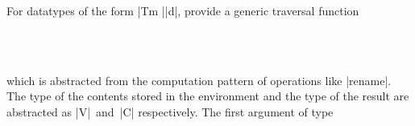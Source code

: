 \documentclass[sigplan,review,fleqn]{acmart}
\renewcommand{\verb}{\collectverb{\color{AgdaFunction}}}
\newcommand{\name}{\collectverb{\it}}
\begin{document}
For datatypes of the form \verb|Tm |\name|d|, \citeauthor{Allais-generic-syntax} provide a generic traversal function
\begin{code}
	\>[0]%
	\>[226I]\AgdaSymbol{:}\AgdaSpace{}%
	\AgdaSpace{}%
	\AgdaSpace{}%
	\AgdaSpace{}%
	\<%
	\\
	\>[.][@{}l@{}]\<[226I]%
	\>[10]\AgdaSpace{}%
	\AgdaSpace{}%
	\AgdaSymbol{\{}\AgdaSymbol{\}}\AgdaSpace{}%
	\AgdaSpace{}%
	\AgdaSpace{}%
	\AgdaSpace{}%
	\AgdaSpace{}%
	\AgdaSpace{}%
	\AgdaSpace{}%
	\AgdaSpace{}%
	\AgdaSymbol{)}\<%
	\\
	\>[10]\AgdaSpace{}%
	\AgdaSpace{}%
	\AgdaSpace{}%
	\AgdaSpace{}%
	\AgdaSpace{}%
	\AgdaSpace{}%
	\AgdaSpace{}%
	\AgdaSpace{}%
	\<%
\end{code}
which is abstracted from the computation pattern of operations like \verb|rename|.
The type of the contents stored in the environment and the type of the result are abstracted as \name|V|~and~\name|C| respectively.
The first argument of type
\begin{code}
	\>[0]\AgdaSpace{}%
	\AgdaSpace{}%
	\AgdaSymbol{(}\AgdaSpace{}%
	\AgdaSymbol{:}\AgdaSpace{}%
	\AgdaSpace{}%
	\AgdaSymbol{)}\AgdaSpace{}%
	\AgdaSymbol{(}\AgdaSpace{}%
	\AgdaSpace{}%
	\AgdaSymbol{:}\AgdaSpace{}%
	\AgdaSpace{}%
	\AgdaSpace{}%
	\AgdaSpace{}%
	\AgdaSpace{}%
	\AgdaSpace{}%
	\AgdaSymbol{)}\AgdaSpace{}%
	\AgdaSymbol{:}\AgdaSpace{}%
	\<
\end{code}
\end{document}
